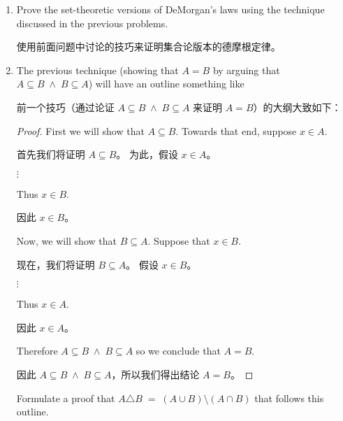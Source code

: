 \begin{enumerate}
{  这个练习，以及前一个练习，实际上只是关于将集合论的陈述转换为它们的逻辑等价物，应用一些我们已经验证过的逻辑规则，然后回到集合论的版本。}
  
   \wbvfill
  
  \workbookpagebreak
   
  \item Prove the set-theoretic versions of DeMorgan's laws using the technique
  discussed in the previous problems.
  
  使用前面问题中讨论的技巧来证明集合论版本的德摩根定律。
  \wbvfill
  
  \workbookpagebreak
  
  \item The previous technique (showing that $A=B$ by arguing that
  $A \subseteq B \; \land \; B \subseteq A$) will have an outline something like
  
  前一个技巧（通过论证 $A \subseteq B \; \land \; B \subseteq A$ 来证明 $A=B$）的大纲大致如下：
  
  \begin{proof} 
  First we will show that $A \subseteq B$.\newline
  Towards that end, suppose $x \in A$.
  
  首先我们将证明 $A \subseteq B$。\newline
  为此，假设 $x \in A$。
  \begin{center}
  $\vdots$
  \end{center}
  
  Thus $x \in B$.
  
  因此 $x \in B$。
  
  Now, we will show that $B \subseteq A$. \newline
  Suppose that $x \in B$.
  
  现在，我们将证明 $B \subseteq A$。\newline
  假设 $x \in B$。
  \begin{center}
  $\vdots$
  \end{center}
  
  Thus $x \in A$.
  
  因此 $x \in A$。
  
  Therefore $A \subseteq B \; \land \; B \subseteq A$ so we conclude that $A=B$.
  
  因此 $A \subseteq B \; \land \; B \subseteq A$，所以我们得出结论 $A=B$。
  \end{proof}
  
  Formulate a proof that $A \triangle B \; = \; (A \cup B) \setminus (A \cap B)$ that follows this outline.
  

\end{enumerate}
